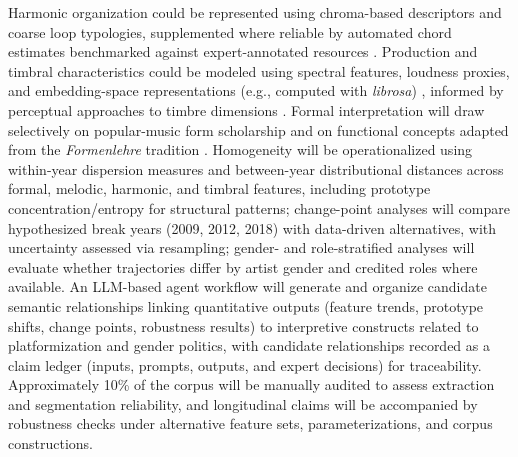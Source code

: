 \documentclass[11pt]{article}
\begin{document}
Harmonic organization could be represented using chroma-based descriptors and coarse loop typologies, supplemented where reliable by automated chord estimates benchmarked against expert-annotated resources \citep{burgoyne2011chord}. Production and timbral characteristics could be modeled using spectral features, loudness proxies, and embedding-space representations (e.g., computed with \textit{librosa}) \citep{mcfee2015librosa}, informed by perceptual approaches to timbre dimensions \citep{McAdams1995Perceptual}. Formal interpretation will draw selectively on popular-music form scholarship \citep{covach2005form,nobile2020} and on functional concepts adapted from the \textit{Formenlehre} tradition \citep{caplin1998,Schmalfeldt2009Process,VandeMoortele2015Formal}. Homogeneity will be operationalized using within-year dispersion measures and between-year distributional distances across formal, melodic, harmonic, and timbral features, including prototype concentration/entropy for structural patterns; change-point analyses will compare hypothesized break years (2009, 2012, 2018) with data-driven alternatives, with uncertainty assessed via resampling; gender- and role-stratified analyses will evaluate whether trajectories differ by artist gender and credited roles where available. An LLM-based agent workflow will generate and organize candidate semantic relationships linking quantitative outputs (feature trends, prototype shifts, change points, robustness results) to interpretive constructs related to platformization and gender politics, with candidate relationships recorded as a claim ledger (inputs, prompts, outputs, and expert decisions) for traceability. Approximately 10\% of the corpus will be manually audited to assess extraction and segmentation reliability, and longitudinal claims will be accompanied by robustness checks under alternative feature sets, parameterizations, and corpus constructions.
\vspace{-0.25em}


\end{document}
